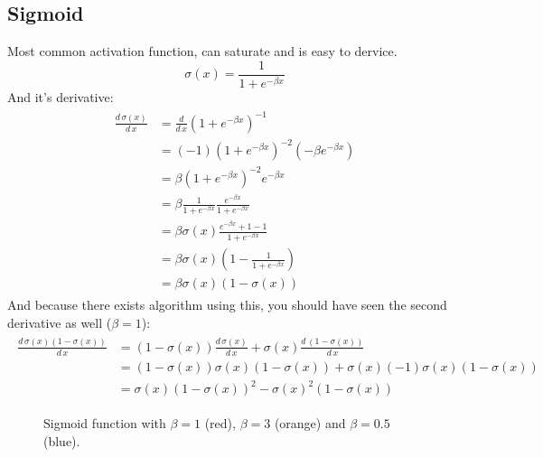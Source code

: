 \subsection{Sigmoid}\label{sec:sigmoid}
Most common activation function, can saturate and is easy to dervice.
\begin{equation}\label{ed:sigmoid}
\sigma(x) = \frac{1}{1 + e^{-\beta x}}
\end{equation}
And it's derivative:
\begin{align}\label{ed:sigmoid_derivative}
\begin{split}
\frac{d\,\sigma(x)}{d\,x} &= \frac{d}{d\,x} (1 + e^{-\beta x})^{-1}\\
&= (-1) (1 + e^{-\beta x})^{-2} (-\beta e^{-\beta x})\\
&= \beta (1 + e^{-\beta x})^{-2} e^{-\beta x}\\
&= \beta \frac{1}{1 + e^{-\beta x}} \frac{e^{-\beta x}}{1 + e^{-\beta x}}\\
&= \beta \sigma(x) \frac{e^{-\beta x} + 1 - 1}{1 + e^{-\beta x}}\\
&= \beta \sigma(x) (1 - \frac{1}{1 + e^{-\beta x}})\\
&= \beta \sigma(x) (1 - \sigma(x))
\end{split}
\end{align}
And because there exists algorithm using this, you should have seen the second derivative as well ($\beta=1$):
\begin{align}
\begin{split}
\frac{d\,\sigma(x)(1-\sigma(x))}{d\,x} &= (1-\sigma(x)) \frac{d\,\sigma(x)}{d\,x} + \sigma(x) \frac{d\,(1-\sigma(x))}{d\,x}\\
&= (1-\sigma(x)) \sigma(x) (1 - \sigma(x)) + \sigma(x) (-1) \sigma(x) (1 - \sigma(x))\\
&= \sigma(x) (1 - \sigma(x))^2 - \sigma(x)^2 (1 - \sigma(x))
\end{split}
\end{align}

\begin{figure}
\centering
{}
\caption{Sigmoid function with $\beta=1$ (red), $\beta=3$ (orange) and $\beta=0.5$ (blue).}
\end{figure}

